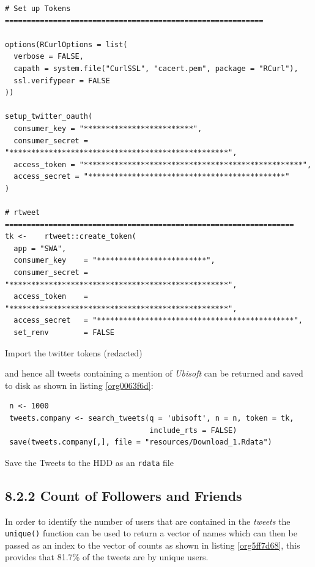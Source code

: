 \documentclass[11pt]{article}
\begin{document}
\begin{listing}[htbp]
\begin{verbatim}
# Set up Tokens ===========================================================

options(RCurlOptions = list(
  verbose = FALSE,
  capath = system.file("CurlSSL", "cacert.pem", package = "RCurl"),
  ssl.verifypeer = FALSE
))

setup_twitter_oauth(
  consumer_key = "*************************",
  consumer_secret = "**************************************************",
  access_token = "**************************************************",
  access_secret = "*********************************************"
)

# rtweet ==================================================================
tk <-    rtweet::create_token(
  app = "SWA",
  consumer_key    = "*************************",
  consumer_secret = "**************************************************",
  access_token    = "**************************************************",
  access_secret   = "*********************************************",
  set_renv        = FALSE
\end{verbatim}
\caption{\label{org25f096b}Import the twitter tokens (redacted)}
\end{listing}

and hence all tweets containing a mention of \emph{Ubisoft} can be returned and saved to disk as shown in listing \ref{org0063f6d}:

\begin{listing}[htbp]
\begin{verbatim}
 n <- 1000
 tweets.company <- search_tweets(q = 'ubisoft', n = n, token = tk,
                                 include_rts = FALSE)
 save(tweets.company[,], file = "resources/Download_1.Rdata")
\end{verbatim}
\caption{\label{org0063f6d}Save the Tweets to the HDD as an \texttt{rdata} file}
\end{listing}

\subsection{8.2.2 Count of Followers and Friends}
\label{sec:org1f4806e}
In order to identify the number of users that are contained in the \emph{tweets} the
\texttt{unique()} function can be used to return a vector of names which can then be passed as an index to the vector of counts as shown in listing \ref{org5ff7d68}, this provides that 81.7\% of the tweets are by unique users.
\end{document}
